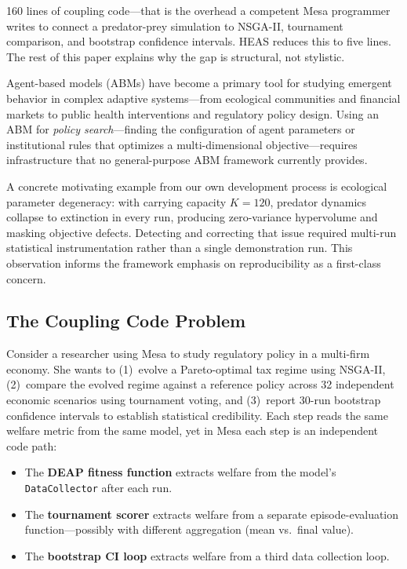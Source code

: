 \documentclass{wscpaperproc}
\begin{document}
160 lines of coupling code---that is the overhead a competent Mesa programmer
writes to connect a predator-prey simulation to NSGA-II, tournament comparison,
and bootstrap confidence intervals. HEAS reduces this to five lines. The rest
of this paper explains why the gap is structural, not stylistic.

Agent-based models (ABMs) have become a primary tool for studying emergent
behavior in complex adaptive systems---from ecological communities and financial
markets to public health interventions and regulatory policy design. Using an
ABM for \emph{policy search}---finding the configuration of agent parameters or
institutional rules that optimizes a multi-dimensional objective---requires
infrastructure that no general-purpose ABM framework currently provides.

A concrete motivating example from our own development process is ecological
parameter degeneracy: with carrying capacity $K=120$, predator dynamics collapse
to extinction in every run, producing zero-variance hypervolume and masking
objective defects. Detecting and correcting that issue required multi-run
statistical instrumentation rather than a single demonstration run. This
observation informs the framework emphasis on reproducibility as a first-class
concern.

\subsection{The Coupling Code Problem}

Consider a researcher using Mesa to study regulatory policy in a multi-firm
economy. She wants to (1)~evolve a Pareto-optimal tax regime using NSGA-II,
(2)~compare the evolved regime against a reference policy across 32 independent
economic scenarios using tournament voting, and (3)~report 30-run bootstrap
confidence intervals to establish statistical credibility. Each step reads the
same welfare metric from the same model, yet in Mesa each step is an independent
code path:

\begin{itemize}
  \item The \textbf{DEAP fitness function} extracts welfare from the model's
        \texttt{DataCollector} after each run.
  \item The \textbf{tournament scorer} extracts welfare from a separate
        episode-evaluation function---possibly with different aggregation
        (mean vs.\ final value).
  \item The \textbf{bootstrap CI loop} extracts welfare from a third data
        collection loop.
\end{itemize}
\end{document}
